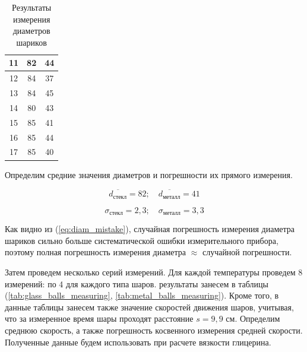 \documentclass[12pt,a4paper]{article}
\begin{document}
\begin{table}[h]
\begin{tabular}{|c|c|c|}
11          & 82                                                                        & 44                                                                           \\ \hline
12          & 84                                                                        & 37                                                                           \\ \hline
13          & 84                                                                        & 45                                                                           \\ \hline
14          & 80                                                                        & 43                                                                           \\ \hline
15          & 85                                                                        & 41                                                                           \\ \hline
16          & 85                                                                        & 44                                                                           \\ \hline
17          & 85                                                                        & 40                                                                           \\ \hline
\end{tabular}
\caption{Результаты измерения диаметров шариков}
\label{tab:results_of_diam_measuring}
\end{table}

Определим средние значения диаметров и погрешности их прямого измерения.

$$\overline{d_{\text{стекл}}}  = 82; \quad \overline{d_{\text{металл}}} = 41$$\label{eq:average_diam}

$$\sigma_{\text{стекл}} = 2,3;\quad  \sigma_{\text{металл}} = 3,3$$\label{eq:diam_mistake}

Как видно из (\ref{eq:diam_mistake}), случайная погрешность измерения диаметра шариков сильно больше систематической ошибки измерительного прибора, поэтому полная погрешность измерения диаметра $\approx$ случайной погрешности.

Затем проведем несколько серий измерений. Для каждой температуры проведем 8 измерений: по 4 для каждого типа шаров. результаты занесем в таблицы (\ref{tab:glass_balls_measuring}, \ref{tab:metal_balls_measuring}). Кроме того, в данные таблицы занесем также значение скоростей движения шаров, учитывая, что за измеренное время шары проходят расстояние $s = 9,9 $ см. Определим среднюю скорость, а также погрешность косвенного измерения средней скорости. Полученные данные будем использовать при расчете вязкости глицерина.
\end{document}
